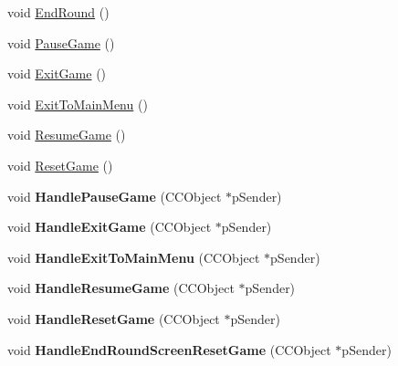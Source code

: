 \begin{DoxyCompactItemize}
\item 
void \hyperlink{class_j_g___game___main_a9848c48c3f87873e28ccb045a5a8b6c0}{End\-Round} ()
\item 
void \hyperlink{class_j_g___game___main_a90e91fdd39573ce58381d40bb92165cc}{Pause\-Game} ()
\item 
void \hyperlink{class_j_g___game___main_abe85ef188133f97bd1b9304cf746fc61}{Exit\-Game} ()
\item 
void \hyperlink{class_j_g___game___main_ac1a2cc0e1e5c75686d474e8c1c6c98ac}{Exit\-To\-Main\-Menu} ()
\item 
void \hyperlink{class_j_g___game___main_a990a62610f857d670d7e127d790ae6a4}{Resume\-Game} ()
\item 
void \hyperlink{class_j_g___game___main_a0e68f6caed366333c956a6fd2ba5b6cc}{Reset\-Game} ()
\item 
\hypertarget{class_j_g___game___main_a5e1824d42413f19f1bbc9022a4fc3946}{void {\bfseries Handle\-Pause\-Game} (C\-C\-Object $\ast$p\-Sender)}\label{class_j_g___game___main_a5e1824d42413f19f1bbc9022a4fc3946}

\item 
\hypertarget{class_j_g___game___main_a41b4f86b39119056afef1808734b9c05}{void {\bfseries Handle\-Exit\-Game} (C\-C\-Object $\ast$p\-Sender)}\label{class_j_g___game___main_a41b4f86b39119056afef1808734b9c05}

\item 
\hypertarget{class_j_g___game___main_aa082f5d13e16c54600d0dc4eea1cd36e}{void {\bfseries Handle\-Exit\-To\-Main\-Menu} (C\-C\-Object $\ast$p\-Sender)}\label{class_j_g___game___main_aa082f5d13e16c54600d0dc4eea1cd36e}

\item 
\hypertarget{class_j_g___game___main_a50281322bcdea1091765573f79499aaf}{void {\bfseries Handle\-Resume\-Game} (C\-C\-Object $\ast$p\-Sender)}\label{class_j_g___game___main_a50281322bcdea1091765573f79499aaf}

\item 
\hypertarget{class_j_g___game___main_ae6fa0a45624b6b40fe10b1c46812f259}{void {\bfseries Handle\-Reset\-Game} (C\-C\-Object $\ast$p\-Sender)}\label{class_j_g___game___main_ae6fa0a45624b6b40fe10b1c46812f259}

\item 
\hypertarget{class_j_g___game___main_ad67312c7ac18fd73066a2d2bc602c137}{void {\bfseries Handle\-End\-Round\-Screen\-Reset\-Game} (C\-C\-Object $\ast$p\-Sender)}\label{class_j_g___game___main_ad67312c7ac18fd73066a2d2bc602c137}


\end{DoxyCompactItemize}
